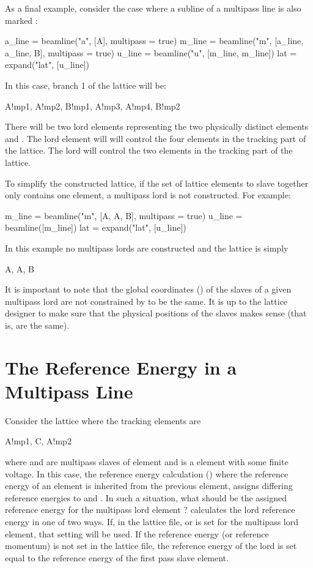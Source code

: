 As a final example, consider the case where a subline of a multipass line is also marked
:
\begin{example}
  a_line = beamline("a", [A], multipass = true)
  m_line = beamline("m", [a_line, a_line, B], multipass = true)
  u_line = beamline("u", [m_line, m_line])
  lat = expand("lat", [u_line])
\end{example}
In this case, branch 1 of the lattice will be:
\begin{example}
  A!mp1, A!mp2, B!mp1, A!mp3, A!mp4, B!mp2
\end{example}
There will be two lord elements representing the two physically distinct elements  and .
The  lord element will will control the four  elements in the tracking
part of the lattice. The  lord will control the two  elements in the tracking part
of the lattice. 

To simplify the constructed lattice, if the set of lattice elements to slave together only contains
one element, a multipass lord is not constructed. For example:
\begin{example}
  m_line = beamline("m", [A, A, B], multipass = true)
  u_line = beamline([m_line])
  lat = expand("lat", [u_line])
\end{example}
In this example no multipass lords are constructed and the lattice is simply
\begin{example}
  A, A, B
\end{example}

It is important to note that the global coordinates () of the slaves of a given
multipass lord are not constrained by \accellat to be the same. It is up to the lattice designer to make
sure that the physical positions of the slaves makes sense (that is, are the same).

\section{The Reference Energy in a Multipass Line}
\label{s:ref.e.multi}

Consider the lattice where the tracking elements are
\begin{example}
  A!mp1, C, A!mp2
\end{example}
where  and  are multipass slaves of element  and  is a 
element with some finite voltage. In this case, the reference energy calculation ()
where the reference energy of an element is inherited from the previous element, assigns differing
reference energies to  and . In such a situation, what should be the assigned
reference energy for the multipass lord element ? \accellat calculates the lord reference energy
in one of two ways. If, in the lattice file,  or  is set for the multipass lord
element, that setting will be used. If the reference energy (or reference momentum) is not set in the lattice
file, the reference energy of the lord is set equal to the reference energy of the first pass slave
element.
